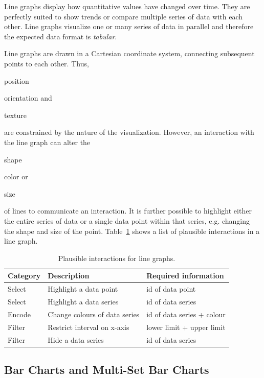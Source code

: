 Line graphs display how quantitative values have changed over time.
They are perfectly suited to show trends or compare multiple series of data with each other.
Line graphs visualize one or many series of data in parallel and therefore the expected data format is \emph{tabular}.

Line graphs are drawn in a Cartesian coordinate system, connecting subsequent points to each other.
Thus,
\begin{enumerate*}[label=(\arabic*)]
    \item position
    \item orientation and
    \item texture
\end{enumerate*}
are constrained by the nature of the visualization.
However, an interaction with the line graph can alter the
\begin{enumerate*}[label=(\arabic*)]
    \item shape
    \item color or
    \item size
\end{enumerate*}
of lines to communicate an interaction.
It is further possible to highlight either the entire series of data or a single data point within that series, e.g. changing the shape and size of the point.
Table~\ref{tab:analysis:line-graph:interactions} shows a list of plausible interactions in a line graph.

\begin{table}[H]
  \centering
  \caption{Plausible interactions for line graphs.}%
  \label{tab:analysis:line-graph:interactions}
  \begin{tabular*}{\textwidth}{lll}
    \bf Category & \bf Description & \bf Required information \\
    \hline
    Select & Highlight a data point & id of data point \\
    Select & Highlight a data series & id of data series \\
    Encode & Change colours of data series & id of data series + colour \\
    Filter & Restrict interval on x-axis & lower limit + upper limit \\
    Filter & Hide a data series & id of data series \\
  \end{tabular*}
\end{table}




\subsection{Bar Charts and Multi-Set Bar Charts}

